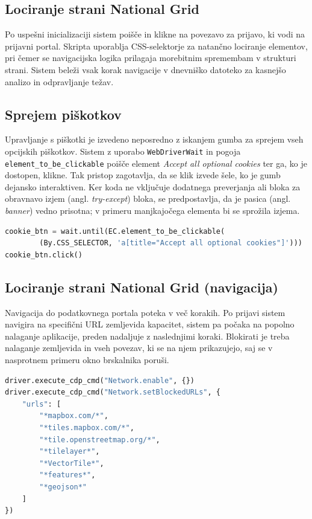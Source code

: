 \documentclass[a4paper,12pt,openright]{book}
\begin{document}
\subsection{Lociranje strani National Grid}
Po uspešni inicializaciji sistem poišče in klikne na povezavo za prijavo, ki vodi na prijavni portal. Skripta uporablja CSS-selektorje za natančno lociranje elementov, pri čemer se navigacijska logika prilagaja morebitnim spremembam v strukturi strani. Sistem beleži vsak korak navigacije v dnevniško datoteko za kasnejšo analizo in odpravljanje težav.
\pagebreak
\subsection{Sprejem piškotkov}
Upravljanje s piškotki je izvedeno neposredno z iskanjem gumba za sprejem vseh opcijskih piškotkov. Sistem z uporabo \texttt{WebDriverWait} in pogoja \texttt{element_to_be_clickable} poišče element \textit{Accept all optional cookies} ter ga, ko je dostopen, klikne. Tak pristop zagotavlja, da se klik izvede šele, ko je gumb dejansko interaktiven. Ker koda ne vključuje dodatnega preverjanja ali bloka za obravnavo izjem (angl. \textit{try-except}) bloka, se predpostavlja, da je pasica (angl. \textit{banner}) vedno prisotna; v primeru manjkajočega elementa bi se sprožila izjema.
\begin{lstlisting}[language=Python, caption={Potrjevanje piškotkov}, captionpos=b, label={lst:mcts}]
cookie_btn = wait.until(EC.element_to_be_clickable(
        (By.CSS_SELECTOR, 'a[title="Accept all optional cookies"]')))
cookie_btn.click()
\end{lstlisting}
\subsection{Lociranje strani National Grid (navigacija)}
Navigacija do podatkovnega portala poteka v več korakih. Po prijavi sistem navigira na specifični URL zemljevida kapacitet, sistem pa počaka na popolno nalaganje aplikacije, preden nadaljuje z naslednjimi koraki. Blokirati je treba nalaganje zemljevida in vseh povezav, ki se na njem prikazujejo, saj se v nasprotnem primeru okno brskalnika poruši.
\pagebreak
\begin{lstlisting}[language=Python, caption={Potrjevanje piškotkov}, captionpos=b, label={lst:mcts}]
driver.execute_cdp_cmd("Network.enable", {})
driver.execute_cdp_cmd("Network.setBlockedURLs", {
    "urls": [
        "*mapbox.com/*",
        "*tiles.mapbox.com/*",
        "*tile.openstreetmap.org/*",
        "*tilelayer*",
        "*VectorTile*",
        "*features*",
        "*geojson*"
    ]
})
\end{lstlisting}
\end{document}
